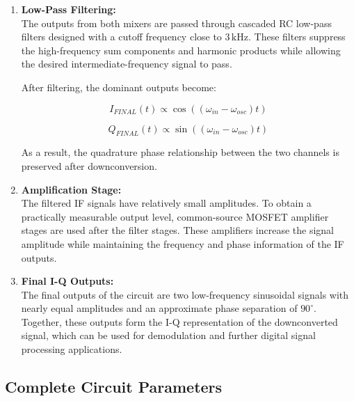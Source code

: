 \documentclass[conference]{IEEEtran}
\begin{document}
\begin{enumerate}
The required downconverted signal is the low-frequency difference component.

\item \textbf{Low-Pass Filtering:} \\

The outputs from both mixers are passed through cascaded RC low-pass filters designed with a cutoff frequency close to $3\,\text{kHz}$. 
These filters suppress the high-frequency sum components and harmonic products while allowing the desired intermediate-frequency signal to pass.

After filtering, the dominant outputs become:

\[
I_{FINAL}(t)\propto \cos((\omega_{in}-\omega_{osc})t)
\]

\[
Q_{FINAL}(t)\propto \sin((\omega_{in}-\omega_{osc})t)
\]

As a result, the quadrature phase relationship between the two channels is preserved after downconversion.

\item \textbf{Amplification Stage:} \\

The filtered IF signals have relatively small amplitudes. 
To obtain a practically measurable output level, common-source MOSFET amplifier stages are used after the filter stages. 
These amplifiers increase the signal amplitude while maintaining the frequency and phase information of the IF outputs.

\item \textbf{Final I-Q Outputs:} \\

The final outputs of the circuit are two low-frequency sinusoidal signals with nearly equal amplitudes and an approximate phase separation of $90^\circ$. 
Together, these outputs form the I-Q representation of the downconverted signal, which can be used for demodulation and further digital signal processing applications.

\end{enumerate}

\subsection{Complete Circuit Parameters}
\end{document}
